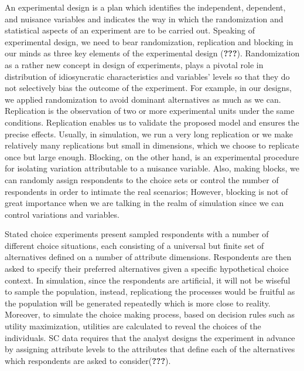 \documentclass[11pt,]{article}
\begin{document}
An experimental design is a plan which identifies the independent,
dependent, and nuisance variables and indicates the way in which the
randomization and statistical aspects of an experiment are to be carried
out. Speaking of experimental design, we need to bear randomization,
replication and blocking in our minds as three key elements of the
experimental design ({\textbf{???}}). Randomization as a rather new
concept in design of experiments, plays a pivotal role in distribution
of idiosyncratic characteristics and variables' levels so that they do
not selectively bias the outcome of the experiment. For example, in our
designs, we applied randomization to avoid dominant alternatives as much
as we can. Replication is the observation of two or more experimental
units under the same conditions. Replication enables us to validate the
proposed model and ensures the precise effects. Usually, in simulation,
we run a very long replication or we make relatively many replications
but small in dimensions, which we choose to replicate once but large
enough. Blocking, on the other hand, is an experimental procedure for
isolating variation attributable to a nuisance variable. Also, making
blocks, we can randomly assign respondents to the choice sets or control
the number of respondents in order to intimate the real scenarios;
However, blocking is not of great importance when we are talking in the
realm of simulation since we can control variations and variables.

Stated choice experiments present sampled respondents with a number of
different choice situations, each consisting of a universal but finite
set of alternatives defined on a number of attribute dimensions.
Respondents are then asked to specify their preferred alternatives given
a specific hypothetical choice context. In simulation, since the
respondents are artificial, it will not be wiseful to sample the
population, instead, replicationg the processes would be fruitful as the
population will be generated repeatedly which is more close to reality.
Moreover, to simulate the choice making process, based on decision rules
such as utility maximization, utilities are calculated to reveal the
choices of the individuals. SC data requires that the analyst designs
the experiment in advance by assigning attribute levels to the
attributes that define each of the alternatives which respondents are
asked to consider({\textbf{???}}).
\end{document}
